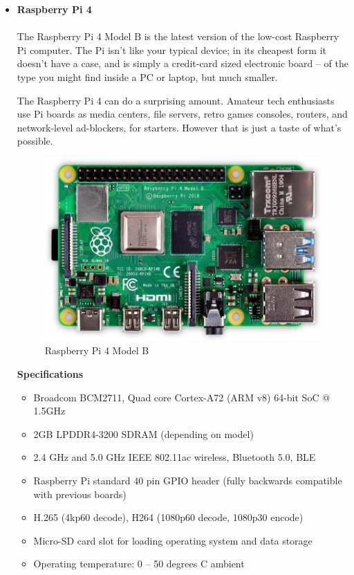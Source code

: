 \begin{itemize}[wide, labelwidth=!, labelindent=0pt]
    \newpage
    
    \item \textbf{Raspberry Pi 4}
    \vspace{-0.5cm}
    \paragraph{}The Raspberry Pi 4 Model B is the latest version of the low-cost Raspberry Pi computer. The Pi isn't like your typical device; in its cheapest form it doesn't have a case, and is simply a credit-card sized electronic board -- of the type you might find inside a PC or laptop, but much smaller.
    
    The Raspberry Pi 4 can do a surprising amount. Amateur tech enthusiasts use Pi boards as media centers, file servers, retro games consoles, routers, and network-level ad-blockers, for starters. However that is just a taste of what's possible. 
    
    \begin{figure}[H]
    \centering
    \includegraphics[width = 11cm]{project/images/raspberry_4_B.jpg}
    \caption{Raspberry Pi 4 Model B}
    \end{figure}
    
    \begin{center}{\textbf{Specifications}}\end{center}
    
    \begin{itemize}
        \item Broadcom BCM2711, Quad core Cortex-A72 (ARM v8) 64-bit SoC @ 1.5GHz
        \item 2GB LPDDR4-3200 SDRAM (depending on model)
        \item 2.4 GHz and 5.0 GHz IEEE 802.11ac wireless, Bluetooth 5.0, BLE
        \item Raspberry Pi standard 40 pin GPIO header (fully backwards compatible with previous boards)
        \item H.265 (4kp60 decode), H264 (1080p60 decode, 1080p30 encode)
        \item Micro-SD card slot for loading operating system and data storage
        \item Operating temperature: 0 – 50 degrees C ambient
    \end{itemize}
    

\end{itemize}

